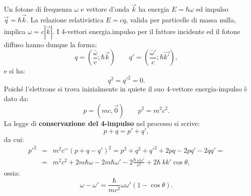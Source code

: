Un fotone di frequenza $\omega$ e vettore d'onda $\vec{k}$ ha energia $E = \hbar \omega$ ed impulso $\vec{q}= \hbar \vec{k}$. La relazione relativistica $E=cq$, valida per particelle di massa nulla, implica $\omega = c|\vec{k}|$. I 4-vettori energia.impulso per il fattore incidente ed il fotone diffuso hanno dunque la forma:
\begin{equation}
q=\left(\frac{\bar \omega}{c}; \hbar \vec{k} \right)\qquad q' = \left(\frac{\bar \omega'}{c}; \hbar \vec{k'} \right),
\end{equation}
e si ha:
\begin{equation}
q^2 = q'^2=0.
\end{equation}
Poiché l'elettrone si trova inizialmente in quiete il suo 4-vettore energia-impulso è dato da:
\begin{equation}
p=\left(mc, \vec{0} \right)\qquad p^2 =m^2 c^2.
\end{equation}
La legge di \textbf{conservazione del 4-impulso} nel processo si scrive:
\begin{equation}
p+q=p'+q',
\end{equation}
da cui:
\begin{eqnarray}
p'^2 &=& m^2 c^ = \left( p +q -q'\right)^2= p^2 + q^2 +q'^2+ 2pq - 2pq' -2 qq'= \nonumber \\
&=& m^2c^2 + 2m\hbar \omega - 2m \hbar \omega ' - 2 \frac{\hbar \ \omega \omega '}{c^2}+2 \hbar \ k k'  \cos \theta ,
\end{eqnarray}
ossia:
\begin{equation}
\omega - \omega ' =\frac{\hbar}{m c^2} \omega \omega ' \left( 1-\cos \theta \right).
\label{eq:cap1_3}
\end{equation}
